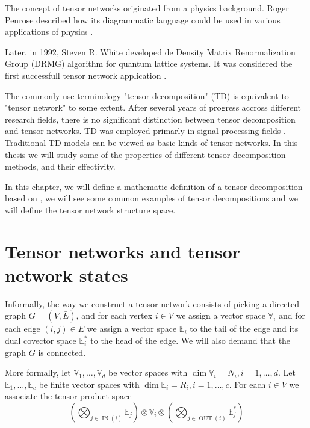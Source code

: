 \documentclass[11pt,a4paper,openright,oneside]{book}
\numberwithin{equation}{section}
\DeclareMathOperator{\IN}{IN}
\DeclareMathOperator{\OUT}{OUT}
\begin{document}
The concept of tensor networks originated from a physics background. Roger Penrose described how its
diagrammatic language could be used in various applications of physics \cite{rogerPenroseApplications}.

Later, in 1992, Steven R. White developed de Density Matrix Renormalization Group (DRMG) algorithm for
quantum lattice systems. It was considered the first successfull tensor network application \cite{whiteDensityMatrixFormulation1992}.

The commonly use terminology "tensor decomposition" (TD) is equivalent to "tensor network" to some extent. After
several years of progress accross different research fields, there is no significant distinction between tensor decomposition
and tensor networks. TD was employed primarly in signal processing fields \cite{wangTensorNetworksMeet2023}. Traditional TD models can be viewed
as basic kinds of tensor networks. In this thesis we will study some of the properties of different tensor decomposition methods,
and their effectivity.

In this chapter, we will define a mathematic definition of a tensor decomposition based on \cite{yeTensorNetworkRanks2019}, we will
see some common examples of tensor decompositions and we will define the 
tensor network structure space.

\section{Tensor networks and tensor network states}

Informally, the way we construct a tensor network consists of picking a directed graph $G = (V, \bar{E})$, and for each vertex $i \in V$ we assign
a vector space $\mathbb{V}_i$ and for each edge $(i,j) \in \bar{E}$ we assign a vector space $\mathbb{E}_i$ to the tail of the edge and its 
dual covector space $\mathbb{E}_i^*$ to the head of the edge. We will also demand that the graph $G$ is connected.

More formally, let $\mathbb{V}_1, \dots, \mathbb{V}_d$ be vector spaces with $\dim{\mathbb{V}_i} = N_i, i = 1, \dots, d$. Let
$\mathbb{E}_1, \dots, \mathbb{E}_c$ be finite vector spaces with $\dim{\mathbb{E}_i} = R_i, i = 1, \dots, c$. For each $i \in V$ we associate
the tensor product space
$$\left( \bigotimes\nolimits_{j \in \IN (i)} \mathbb{E}_j \right) \otimes \mathbb{V}_i \otimes 
\left( \bigotimes\nolimits_{j \in \OUT (i)} \mathbb{E}_j^*  \right)$$
\end{document}
